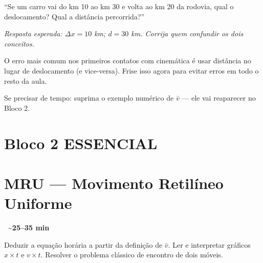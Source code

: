 \documentclass[12pt,a4paper]{article}
\newcommand{\tempo}[1]{%
  \begin{flushright}
    \colorbox{azulphysics!20}{\small\textbf{\faClock\ \textasciitilde{}#1 min}}
  \end{flushright}\vspace{-0.5em}
}
\begin{document}
\begin{tcolorbox}[perguntabox]
  ``Se um carro vai do km 10 ao km 30 e volta ao km 20 da rodovia,
  qual o deslocamento? Qual a dist\^ancia percorrida?''

  \textit{Resposta esperada: $\Delta x = 10$ km; $d = 30$ km.
  Corrija quem confundir os dois conceitos.}
\end{tcolorbox}

\begin{tcolorbox}[dicabox]
  O erro mais comum nos primeiros contatos com cinem\'atica \'e usar
  dist\^ancia no lugar de deslocamento (e vice-versa). Frise isso agora
  para evitar erros em todo o resto da aula.
\end{tcolorbox}

\begin{tcolorbox}[cortebox]
  Se precisar de tempo: suprima o exemplo num\'erico de $\bar{v}$ ---
  ele vai reaparecer no Bloco 2.
\end{tcolorbox}

\newpage

\section*{Bloco 2 \hfill\colorbox{verdeok!30}{\small ESSENCIAL}}
\section*{\hspace{1.2em}MRU --- Movimento Retil\'ineo Uniforme}
\tempo{25--35}

\begin{tcolorbox}[blocobox={Objetivos}]
  Deduzir a equação horária a partir da definição de $\bar v$.
  Ler e interpretar gráficos $x \times t$ e $v \times t$.
  Resolver o problema clássico de encontro de dois móveis.
\end{tcolorbox}
\end{document}
